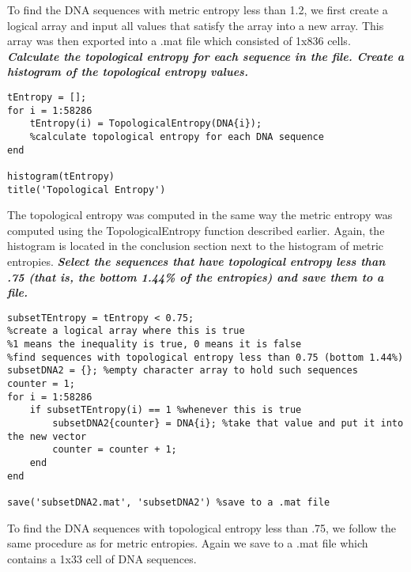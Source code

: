\documentclass{article}
\begin{document}
To find the DNA sequences with metric entropy less than 1.2, we first create a logical array and input all values that satisfy the array into a new array.
This array was then exported into a .mat file which consisted of 1x836 cells.
\newline
\newline
\newline
\noindent\textbf{\textit{Calculate the topological entropy for each sequence in the file. 
Create a histogram of the topological entropy values.}}
\newline
\begin{lstlisting}
tEntropy = [];
for i = 1:58286
    tEntropy(i) = TopologicalEntropy(DNA{i});
    %calculate topological entropy for each DNA sequence
end

histogram(tEntropy)
title('Topological Entropy')
\end{lstlisting}
The topological entropy was computed in the same way the metric entropy was computed using the TopologicalEntropy function described earlier.
Again, the histogram is located in the conclusion section next to the histogram of metric entropies.
\newline
\newline
\newline
\noindent\textbf{\textit{Select the sequences that have topological entropy less than .75 (that is, the bottom 1.44\% of the entropies) and save them to a file.}}
\newline
\begin{lstlisting}
subsetTEntropy = tEntropy < 0.75;
%create a logical array where this is true
%1 means the inequality is true, 0 means it is false
%find sequences with topological entropy less than 0.75 (bottom 1.44%)
subsetDNA2 = {}; %empty character array to hold such sequences
counter = 1;
for i = 1:58286
    if subsetTEntropy(i) == 1 %whenever this is true
        subsetDNA2{counter} = DNA{i}; %take that value and put it into the new vector
        counter = counter + 1;
    end
end
        
save('subsetDNA2.mat', 'subsetDNA2') %save to a .mat file
\end{lstlisting}
To find the DNA sequences with topological entropy less than .75, we follow the same procedure as for metric entropies.
Again we save to a .mat file which contains a 1x33 cell of DNA sequences.
\end{document}
